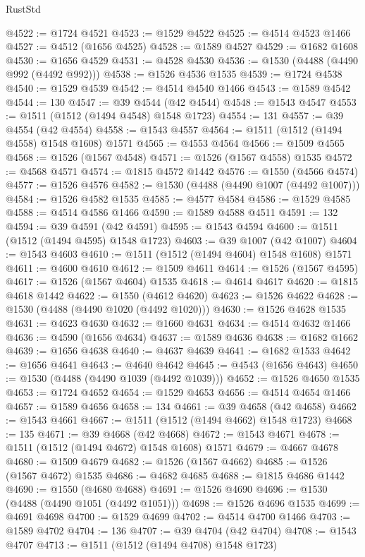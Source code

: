 \begin{lexlean}{RustStd}
\begin{coremodule}
{\begin{coremodule}
{{{{{{{{{{{{{{{{{{{{{{{{{{{{{{{{{{{@4522 := @1724 @4521
@4523 := @1529 @4522
@4525 := @4514 @4523 @1466
@4527 := @4512 (@1656 @4525)
@4528 := @1589 @4527
@4529 := @1682 @1608
@4530 := @1656 @4529
@4531 := @4528 @4530
@4536 := @1530 (@4488 (@4490 @992 (@4492 @992)))
@4538 := @1526 @4536 @1535
@4539 := @1724 @4538
@4540 := @1529 @4539
@4542 := @4514 @4540 @1466
@4543 := @1589 @4542
@4544 := 130
@4547 := @39 @4544 (@42 @4544)
@4548 := @1543 @4547
@4553 := @1511 (@1512 (@1494 @4548) @1548 @1723)
@4554 := 131
@4557 := @39 @4554 (@42 @4554)
@4558 := @1543 @4557
@4564 := @1511 (@1512 (@1494 @4558) @1548 @1608) @1571
@4565 := @4553 @4564
@4566 := @1509 @4565
@4568 := @1526 (@1567 @4548)
@4571 := @1526 (@1567 @4558) @1535
@4572 := @4568 @4571
@4574 := @1815 @4572 @1442
@4576 := @1550 (@4566 @4574)
@4577 := @1526 @4576
@4582 := @1530 (@4488 (@4490 @1007 (@4492 @1007)))
@4584 := @1526 @4582 @1535
@4585 := @4577 @4584
@4586 := @1529 @4585
@4588 := @4514 @4586 @1466
@4590 := @1589 @4588 @4511
@4591 := 132
@4594 := @39 @4591 (@42 @4591)
@4595 := @1543 @4594
@4600 := @1511 (@1512 (@1494 @4595) @1548 @1723)
@4603 := @39 @1007 (@42 @1007)
@4604 := @1543 @4603
@4610 := @1511 (@1512 (@1494 @4604) @1548 @1608) @1571
@4611 := @4600 @4610
@4612 := @1509 @4611
@4614 := @1526 (@1567 @4595)
@4617 := @1526 (@1567 @4604) @1535
@4618 := @4614 @4617
@4620 := @1815 @4618 @1442
@4622 := @1550 (@4612 @4620)
@4623 := @1526 @4622
@4628 := @1530 (@4488 (@4490 @1020 (@4492 @1020)))
@4630 := @1526 @4628 @1535
@4631 := @4623 @4630
@4632 := @1660 @4631
@4634 := @4514 @4632 @1466
@4636 := @4590 (@1656 @4634)
@4637 := @1589 @4636
@4638 := @1682 @1662
@4639 := @1656 @4638
@4640 := @4637 @4639
@4641 := @1682 @1533
@4642 := @1656 @4641
@4643 := @4640 @4642
@4645 := @4543 (@1656 @4643)
@4650 := @1530 (@4488 (@4490 @1039 (@4492 @1039)))
@4652 := @1526 @4650 @1535
@4653 := @1724 @4652
@4654 := @1529 @4653
@4656 := @4514 @4654 @1466
@4657 := @1589 @4656
@4658 := 134
@4661 := @39 @4658 (@42 @4658)
@4662 := @1543 @4661
@4667 := @1511 (@1512 (@1494 @4662) @1548 @1723)
@4668 := 135
@4671 := @39 @4668 (@42 @4668)
@4672 := @1543 @4671
@4678 := @1511 (@1512 (@1494 @4672) @1548 @1608) @1571
@4679 := @4667 @4678
@4680 := @1509 @4679
@4682 := @1526 (@1567 @4662)
@4685 := @1526 (@1567 @4672) @1535
@4686 := @4682 @4685
@4688 := @1815 @4686 @1442
@4690 := @1550 (@4680 @4688)
@4691 := @1526 @4690
@4696 := @1530 (@4488 (@4490 @1051 (@4492 @1051)))
@4698 := @1526 @4696 @1535
@4699 := @4691 @4698
@4700 := @1529 @4699
@4702 := @4514 @4700 @1466
@4703 := @1589 @4702
@4704 := 136
@4707 := @39 @4704 (@42 @4704)
@4708 := @1543 @4707
@4713 := @1511 (@1512 (@1494 @4708) @1548 @1723)
}}}}}}}}}}}}}}}}}}}}}}}}}}}}}}}}}}}
\end{coremodule}}
\end{coremodule}
\end{lexlean}
